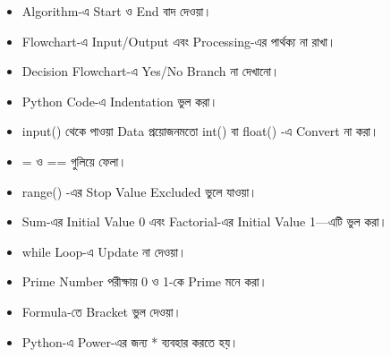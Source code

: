 

\begin{rememberbox}

\begin{itemize}

\item Algorithm-এ Start ও End বাদ দেওয়া।

\item Flowchart-এ Input/Output এবং Processing-এর পার্থক্য না রাখা।

\item Decision Flowchart-এ Yes/No Branch না দেখানো।

\item Python Code-এ Indentation ভুল করা।

\item
\textenglish{\ttfamily input()}
থেকে পাওয়া Data প্রয়োজনমতো
\textenglish{\ttfamily int()}
বা
\textenglish{\ttfamily float()}
-এ Convert না করা।

\item
\textenglish{\ttfamily =}
ও
\textenglish{\ttfamily ==}
গুলিয়ে ফেলা।

\item
\textenglish{\ttfamily range()}
-এর Stop Value Excluded ভুলে যাওয়া।

\item Sum-এর Initial Value 0 এবং Factorial-এর Initial Value 1—এটি ভুল করা।

\item
\textenglish{\ttfamily while}
Loop-এ Update না দেওয়া।

\item Prime Number পরীক্ষায় 0 ও 1-কে Prime মনে করা।

\item Formula-তে Bracket ভুল দেওয়া।

\item Python-এ Power-এর জন্য
\textenglish{\ttfamily **}
ব্যবহার করতে হয়।

\end{itemize}

\end{rememberbox}


